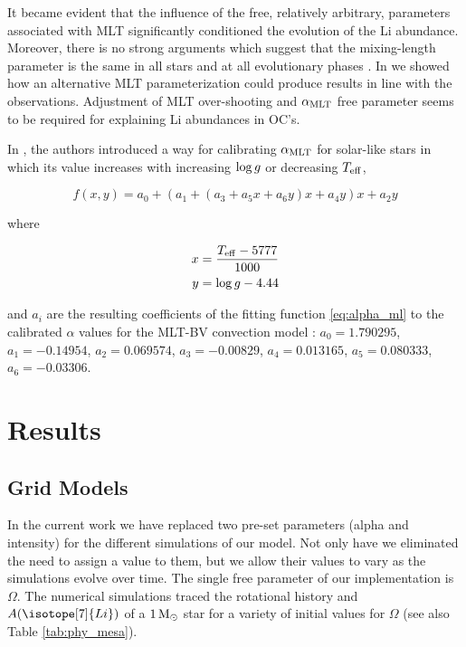 \documentclass[fleqn,usenatbib]{mnras}
\begin{document}
 It became evident that the influence of the free, relatively arbitrary, parameters associated with MLT significantly conditioned the evolution of the Li abundance. Moreover, there is no strong arguments which suggest that the mixing-length parameter is the same in all stars and at all evolutionary phases \citep{Pasetto2014}. In \cite{Navarro2020} we showed how an alternative MLT parameterization could produce results in line with the observations. Adjustment of MLT over-shooting and $\alpha_{\mathrm{MLT}}$ free parameter seems to be required for explaining Li abundances in OC's.\par

In \cite{Sonoi2018}, the authors introduced a way for calibrating $\alpha_{\mathrm{MLT}}$ for solar-like stars in which its value increases with increasing $\mathrm{log} \, g$ or decreasing $T_{\mathrm{eff}}$,

\begin{ceqn}
\begin{equation}
 f(x,y) = a_0 + (a_1 + (a_3 + a_5x +a_6y)x + a_4y)x + a_2y\label{eq:alpha_ml}
\end{equation}
\end{ceqn}
where
\begin{ceqn}
\begin{align}
     x &= \frac{T_{\mathrm{eff}}-5777}{1000} \label{eq:eq:alpha_x}\\
     y &= \mathrm{log} \, g-4.44 \label{eq:eq:alpha_y}
\end{align}
\end{ceqn}
and $a_i$ are the resulting coefficients of the fitting function \ref{eq:alpha_ml} to the calibrated $\alpha$ values for the MLT-BV convection model \citep{Sonoi2018}: $a_0=1.790295$, $a_1=-0.14954$, $a_2=0.069574$, $a_3=-0.00829$, $a_4=0.013165$, $a_5=0.080333$, $a_6=-0.03306$.\par

\section{Results} \label{sec_3}

\subsection{Grid Models} \label{sec_grid}
In the current work we have replaced two pre-set parameters (alpha and intensity) for the different simulations of our model. Not only have we eliminated the need to assign a value to them, but we allow their values to vary as the simulations evolve over time. The single free parameter of our implementation is $\Omega$. The numerical simulations traced the rotational history and $A(\isotope[7]{Li})$ of a $1\, \mathrm{M}_\odot$ star for a variety of initial values for $\Omega$ (see also Table \ref{tab:phy_mesa}).\par
\end{document}
